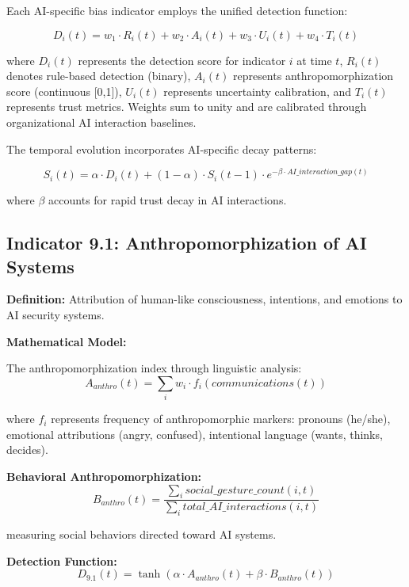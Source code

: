 \documentclass[11pt,a4paper]{article}
\begin{document}
Each AI-specific bias indicator employs the unified detection function:

\begin{equation}
D_i(t) = w_1 \cdot R_i(t) + w_2 \cdot A_i(t) + w_3 \cdot U_i(t) + w_4 \cdot T_i(t)
\end{equation}

where $D_i(t)$ represents the detection score for indicator $i$ at time $t$, $R_i(t)$ denotes rule-based detection (binary), $A_i(t)$ represents anthropomorphization score (continuous [0,1]), $U_i(t)$ represents uncertainty calibration, and $T_i(t)$ represents trust metrics. Weights sum to unity and are calibrated through organizational AI interaction baselines.

The temporal evolution incorporates AI-specific decay patterns:

\begin{equation}
S_i(t) = \alpha \cdot D_i(t) + (1-\alpha) \cdot S_i(t-1) \cdot e^{-\beta \cdot AI\_interaction\_gap(t)}
\end{equation}

where $\beta$ accounts for rapid trust decay in AI interactions.

\subsection{Indicator 9.1: Anthropomorphization of AI Systems}

\textbf{Definition:} Attribution of human-like consciousness, intentions, and emotions to AI security systems.

\textbf{Mathematical Model:}

The anthropomorphization index through linguistic analysis:
\begin{equation}
A_{anthro}(t) = \sum_{i} w_i \cdot f_i(communications(t))
\end{equation}

where $f_i$ represents frequency of anthropomorphic markers: pronouns (he/she), emotional attributions (angry, confused), intentional language (wants, thinks, decides).

\textbf{Behavioral Anthropomorphization:}
\begin{equation}
B_{anthro}(t) = \frac{\sum_{i} social\_gesture\_count(i,t)}{\sum_{i} total\_AI\_interactions(i,t)}
\end{equation}

measuring social behaviors directed toward AI systems.

\textbf{Detection Function:}
\begin{equation}
D_{9.1}(t) = \tanh(\alpha \cdot A_{anthro}(t) + \beta \cdot B_{anthro}(t))
\end{equation}
\end{document}
